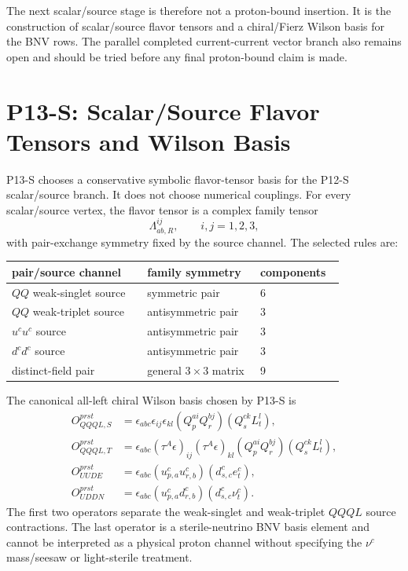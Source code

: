 \documentclass[11pt]{article}
\newcommand{\uc}{u^c}
\newcommand{\dc}{d^c}
\newcommand{\nuc}{\nu^c}
\newcommand{\ec}{e^c}
\begin{document}
The next scalar/source stage is therefore not a proton-bound insertion.  It is
the construction of scalar/source flavor tensors and a chiral/Fierz Wilson
basis for the BNV rows.  The parallel completed current-current vector branch
also remains open and should be tried before any final proton-bound claim is
made.

\section{P13-S: Scalar/Source Flavor Tensors and Wilson Basis}

P13-S chooses a conservative symbolic flavor-tensor basis for the P12-S
scalar/source branch.  It does not choose numerical couplings.  For every
scalar/source vertex, the flavor tensor is a complex family tensor
\begin{equation}
  \Lambda_{ab,R}^{ij},
  \qquad i,j=1,2,3,
\end{equation}
with pair-exchange symmetry fixed by the source channel.  The selected rules
are:
\begin{center}
\small
\begin{tabular}{p{0.36\linewidth}p{0.30\linewidth}p{0.18\linewidth}}
\toprule
pair/source channel & family symmetry & components\\
\midrule
$QQ$ weak-singlet source & symmetric pair & 6\\
$QQ$ weak-triplet source & antisymmetric pair & 3\\
$\uc\uc$ source & antisymmetric pair & 3\\
$\dc\dc$ source & antisymmetric pair & 3\\
distinct-field pair & general $3\times3$ matrix & 9\\
\bottomrule
\end{tabular}
\end{center}

The canonical all-left chiral Wilson basis chosen by P13-S is
\begin{align}
  O_{QQQL,S}^{prst}
  &=
  \epsilon_{abc}\epsilon_{ij}\epsilon_{kl}
  (Q_p^{ai}Q_r^{bj})(Q_s^{ck}L_t^l),\\
  O_{QQQL,T}^{prst}
  &=
  \epsilon_{abc}(\tau^A\epsilon)_{ij}(\tau^A\epsilon)_{kl}
  (Q_p^{ai}Q_r^{bj})(Q_s^{ck}L_t^l),\\
  O_{UUDE}^{prst}
  &=
  \epsilon_{abc}
  (\uc_{p,a}\uc_{r,b})(\dc_{s,c}\ec_t),\\
  O_{UDDN}^{prst}
  &=
  \epsilon_{abc}
  (\uc_{p,a}\dc_{r,b})(\dc_{s,c}\nuc_t).
\end{align}
The first two operators separate the weak-singlet and weak-triplet $QQQL$
source contractions.  The last operator is a sterile-neutrino BNV basis element
and cannot be interpreted as a physical proton channel without specifying the
$\nuc$ mass/seesaw or light-sterile treatment.
\end{document}
